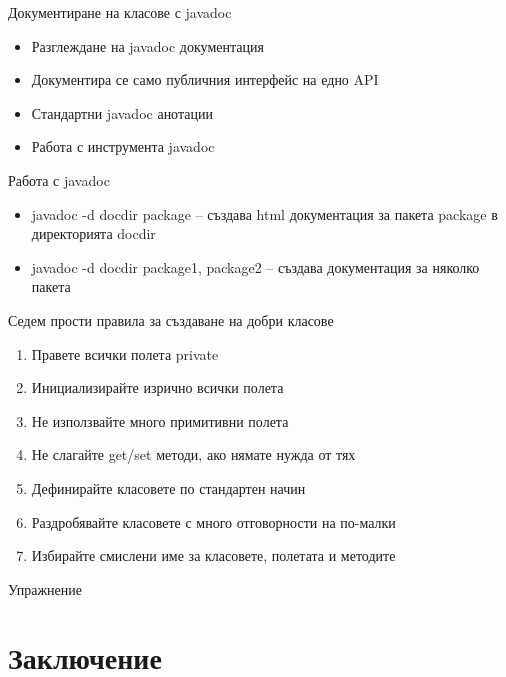 \documentclass{beamer}
\begin{document}
\begin{frame}{Документиране на класове с javadoc}
  \transdissolve
  \begin{itemize}
  \item Разглеждане на javadoc документация
  \item Документира се само публичния интерфейс на едно API
  \item Стандартни javadoc анотации
  \item Работа с инструмента javadoc
  \end{itemize}
\end{frame}

\begin{frame}{Работа с javadoc}
  \transdissolve
  \begin{itemize}
  \item   javadoc -d docdir package – създава html
    документация за пакета package в
    директорията docdir
  \item  javadoc -d docdir package1, package2 –
    създава документация за няколко пакета

  \end{itemize}
\end{frame}

\begin{frame}{Седем прости правила за създаване на добри класове}
  \transdissolve
  \begin{enumerate}
    \item Правете всички полета private
    \item Инициализирайте изрично всички полета
    \item Не използвайте много примитивни полета
    \item Не слагайте get/set методи, ако нямате нужда от тях
    \item Дефинирайте класовете по стандартен начин
    \item Раздробявайте класовете с много отговорности на по-малки
    \item Избирайте смислени име за класовете, полетата и методите
  \end{enumerate}
\end{frame}


\begin{frame}{Упражнение}
  \transdissolve
  
\end{frame}


\section*{Заключение}
\end{document}

